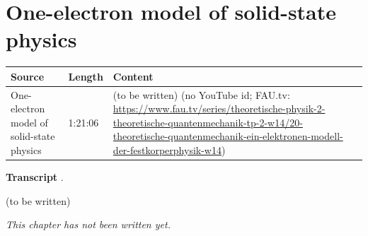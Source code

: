 \chapter{One-electron model of solid-state physics}\label{ch:c20}
\begin{paracol}{2}

\begin{sources}
\begin{tabularx}{\linewidth}{@{}l l L@{}}
\toprule
\textbf{Source} & \textbf{Length} & \textbf{Content}\\
\midrule
One-electron model of solid-state physics & 1:21:06 & (to be written) (no YouTube id; FAU.tv: \url{https://www.fau.tv/series/theoretische-physik-2-theoretische-quantenmechanik-tp-2-w14/20-theoretische-quantenmechanik-ein-elektronen-modell-der-festkorperphysik-w14})\\
\bottomrule
\end{tabularx}

\smallskip
\textbf{Transcript} .
\end{sources}

\begin{reading}
(to be written)
\end{reading}

\emph{This chapter has not been written yet.}

\flushside
\end{paracol}
